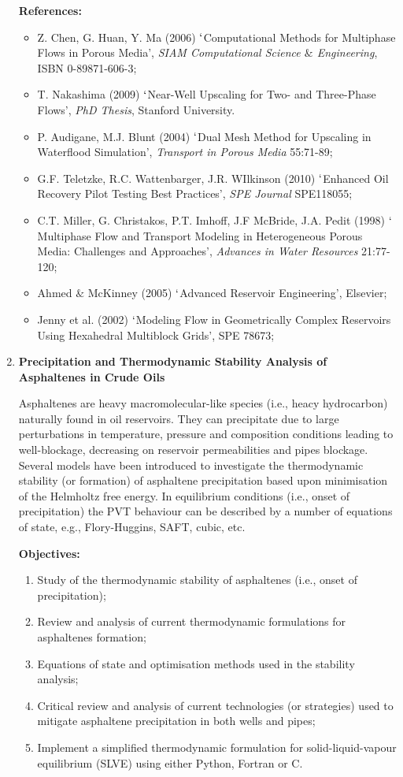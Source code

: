 \documentclass[12pts,a4paper,amsmath,amssymb,floatfix]{article}%
\begin{document}
\begin{enumerate}[label=\bfseries Project \arabic*:]
\noindent
{\bf References:}
\begin{itemize}
\item Z. Chen, G. Huan, Y. Ma (2006) $\lq$Computational Methods for Multiphase Flows in Porous Media', {\it SIAM Computational Science $\&$ Engineering}, ISBN 0-89871-606-3;
\item T. Nakashima (2009) $\lq$Near-Well Upscaling for Two- and Three-Phase Flows', {\it PhD Thesis}, Stanford University.
\item P. Audigane, M.J. Blunt (2004) $\lq$Dual Mesh Method for Upscaling in Waterflood Simulation', {\it Transport in Porous Media} 55:71-89;
\item G.F. Teletzke, R.C. Wattenbarger, J.R. WIlkinson (2010) $\lq$Enhanced Oil Recovery Pilot Testing Best Practices', {\it SPE Journal} SPE118055;
\item C.T. Miller, G. Christakos, P.T. Imhoff, J.F McBride, J.A. Pedit (1998) $\lq$Multiphase Flow and Transport Modeling in Heterogeneous Porous Media: Challenges and Approaches', {\it Advances in Water Resources} 21:77-120;
\item  Ahmed $\&$ McKinney (2005) $\lq$Advanced Reservoir Engineering’, Elsevier;
\item Jenny et al. (2002) $\lq$Modeling Flow in Geometrically Complex Reservoirs Using Hexahedral Multiblock Grids’, SPE 78673;
\end{itemize}


\clearpage
\item {\bf Precipitation and Thermodynamic Stability Analysis of Asphaltenes in Crude Oils}

Asphaltenes are heavy macromolecular-like species (i.e., heacy hydrocarbon) naturally found in oil reservoirs. They can precipitate due to large perturbations in temperature, pressure and composition conditions leading to well-blockage, decreasing on reservoir permeabilities and pipes blockage. Several models have been introduced to investigate the thermodynamic stability (or formation) of asphaltene precipitation based upon minimisation of the Helmholtz free energy. In equilibrium conditions (i.e., onset of precipitation) the PVT behaviour can be described by a number of equations of state, e.g., Flory-Huggins, SAFT, cubic, etc. 

\noindent
{\bf Objectives:}
\begin{enumerate}
\item Study of the thermodynamic stability of asphaltenes (i.e., onset of precipitation); 
\item Review and analysis of current thermodynamic formulations for asphaltenes formation; 
\item Equations of state and optimisation methods used in the stability analysis; 
\item Critical review and analysis of current technologies (or strategies) used to mitigate asphaltene precipitation in both wells and pipes;
\item Implement a simplified thermodynamic formulation for solid-liquid-vapour equilibrium (SLVE) using either Python, Fortran or C.
\end{enumerate} 
 

\end{enumerate}
\end{document}

